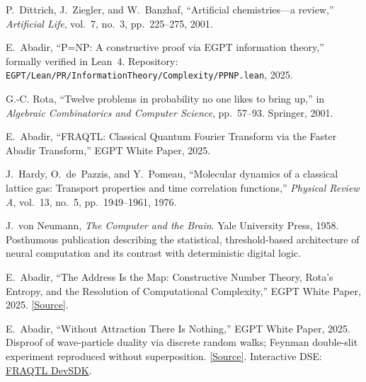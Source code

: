 \documentclass[11pt,a4paper]{article}
\begin{document}
\begin{enumerate}[label={[\arabic*]}, leftmargin=*, itemsep=2pt]
    \item \label{ref:dittrich} P.~Dittrich, J.~Ziegler, and W.~Banzhaf, ``Artificial chemistries---a review,'' \emph{Artificial Life}, vol.~7, no.~3, pp.~225--275, 2001.

    \item \label{ref:PPNP} E.~Abadir, ``P=NP: A constructive proof via EGPT information theory,'' formally verified in Lean~4. Repository: \texttt{EGPT/Lean/PR/InformationTheory/Complexity/PPNP.lean}, 2025.

    \item \label{ref:rota} G.-C. Rota, ``Twelve problems in probability no one likes to bring up,'' in \emph{Algebraic Combinatorics and Computer Science}, pp.~57--93. Springer, 2001.

    \item \label{ref:fraqtl} E.~Abadir, ``FRAQTL: Classical Quantum Fourier Transform via the Faster Abadir Transform,'' EGPT White Paper, 2025.

    \item \label{ref:hardy} J.~Hardy, O.~de~Pazzis, and Y.~Pomeau, ``Molecular dynamics of a classical lattice gas: Transport properties and time correlation functions,'' \emph{Physical Review A}, vol.~13, no.~5, pp.~1949--1961, 1976.

    \item \label{ref:vonneumann_brain} J.~von Neumann, \emph{The Computer and the Brain}. Yale University Press, 1958. Posthumous publication describing the statistical, threshold-based architecture of neural computation and its contrast with deterministic digital logic.

    \item \label{ref:address_map} E.~Abadir, ``The Address Is the Map: Constructive Number Theory, Rota's Entropy, and the Resolution of Computational Complexity,'' EGPT White Paper, 2025. \href{https://eabadir.github.io/EGPT/content/Papers/Address_Is_The_Map/Address_Is_The_Map.tex}{[Source]}.

    \item \label{ref:without_attraction} E.~Abadir, ``Without Attraction There Is Nothing,'' EGPT White Paper, 2025. Disproof of wave-particle duality via discrete random walks; Feynman double-slit experiment reproduced without superposition. \href{https://eabadir.github.io/EGPT/content/Papers/Without_Attraction_There_Is_Nothing/Without_Attraction_There_Is_Nothing.tex}{[Source]}. Interactive DSE: \href{https://eabadir.github.io/EGPT/www/fraqtl_devsdk/index.html}{FRAQTL DevSDK}.


\end{enumerate}
\end{document}

